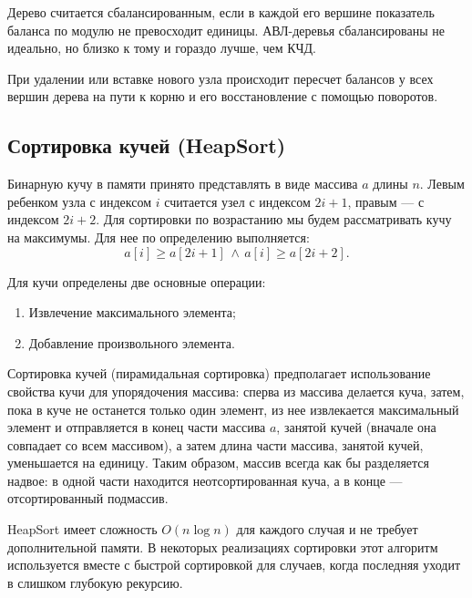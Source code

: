 Дерево считается сбалансированным, если в каждой его вершине показатель баланса
по модулю не превосходит единицы. АВЛ-деревья сбалансированы не идеально, но близко
к тому и гораздо лучше, чем КЧД.

При удалении или вставке нового узла происходит пересчет балансов у всех вершин дерева на пути к корню
и его восстановление с помощью поворотов.

\subsection{Сортировка кучей (HeapSort)}
Бинарную кучу в памяти принято представлять в виде массива $a$ длины $n$.
Левым ребенком узла с индексом $i$ считается узел с индексом $2i+1$,
правым --- с индексом $2i+2$. Для сортировки по возрастанию мы будем рассматривать кучу
на максимумы. Для нее по определению выполняется:
$$ a[i] \geq a[2i+1]\, \land\, a[i] \geq a[2i+2]. $$

Для кучи определены две основные операции:
\begin{enumerate}
  \item Извлечение максимального элемента;
  \item Добавление произвольного элемента.
\end{enumerate}

Сортировка кучей (пирамидальная сортировка) предполагает использование свойства кучи для упорядочения массива:
сперва из массива делается куча, затем, пока в куче не останется только один элемент,
из нее извлекается максимальный элемент и отправляется в конец части массива $a$,
занятой кучей (вначале она совпадает со всем массивом), а затем длина части массива,
занятой кучей, уменьшается на единицу. Таким образом, массив всегда как бы разделяется
надвое: в одной части находится неотсортированная куча, а в конце --- отсортированный
подмассив.

HeapSort имеет сложность $O(n\log n)$ для каждого случая и не требует дополнительной памяти. В некоторых
реализациях сортировки этот алгоритм используется вместе с быстрой сортировкой для случаев, когда
последняя уходит в слишком глубокую рекурсию.

